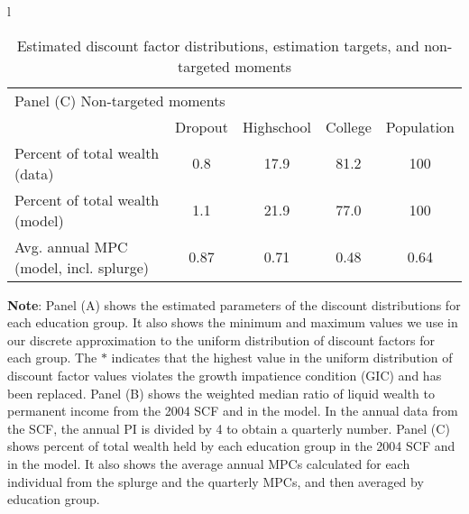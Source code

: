 \documentclass[\econtexRoot/HAFiscal]{subfiles}
\begin{document}
\begin{table}[tp]
\begin{center}
\begin{tabular}{l}
      \begin{tabular}{lcccc}
        \multicolumn{5}{l}{Panel (C) Non-targeted moments} \\ 
        & Dropout & Highschool & College & Population \\ \midrule
        Percent of total wealth (data) & 0.8 & 17.9 & 81.2 & 100 \\
        Percent of total wealth (model) & 1.1 & 21.9 & 77.0 & 100 \\
        Avg. annual MPC (model, incl. splurge) & 0.87 & 0.71 & 0.48 & 0.64
        \\ \bottomrule 
      \end{tabular}
    \end{tabular}
    \caption{Estimated discount factor distributions, estimation targets, and non-targeted moments}
    \notinsubfile{\label{tab:estimBetas}}
    \parbox{16cm}{\small \vspace{.15cm} \textbf{Note}: Panel (A) shows the estimated parameters of the discount distributions for each education group. It also shows the minimum and maximum values we use in our discrete approximation to the uniform distribution of discount factors for each group. The $*$ indicates that the highest value in the uniform distribution of discount factor values violates the growth impatience condition (GIC) and has been replaced. Panel (B) shows the weighted median ratio of liquid wealth to permanent income from the 2004 SCF and in the model. In the annual data from the SCF, the annual PI is divided by 4 to obtain a quarterly number. Panel (C) shows percent of total wealth held by each education group in the 2004 SCF and in the model. It also shows the average annual MPCs calculated for each individual from the splurge and the quarterly MPCs, and then averaged by education group.\normalsize}
  \end{center}
\end{table}
\end{document}
